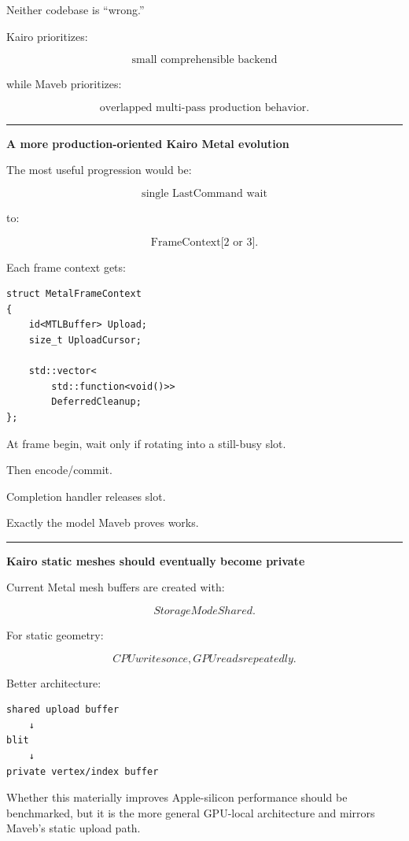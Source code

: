 Neither codebase is ``wrong.''

Kairo prioritizes:

\[
\boxed{
\text{small comprehensible backend}
}
\]

while Maveb prioritizes:

\[
\boxed{
\text{overlapped multi-pass production behavior}.
}
\]

\begin{center}\rule{0.5\linewidth}{0.5pt}\end{center}

\textbf{A more production-oriented Kairo Metal evolution}

The most useful progression would be:

\[
\text{single LastCommand wait}
\]

to:

\[
\text{FrameContext[2 or 3]}.
\]

Each frame context gets:

\begin{verbatim}
struct MetalFrameContext
{
    id<MTLBuffer> Upload;
    size_t UploadCursor;

    std::vector<
        std::function<void()>>
        DeferredCleanup;
};
\end{verbatim}

At frame begin, wait only if rotating into a still-busy slot.

Then encode/commit.

Completion handler releases slot.

Exactly the model Maveb proves works.

\begin{center}\rule{0.5\linewidth}{0.5pt}\end{center}

\textbf{Kairo static meshes should eventually become private}

Current Metal mesh buffers are created with:

\[
StorageModeShared.
\]

For static geometry:

\[
CPU writes once,
GPU reads repeatedly.
\]

Better architecture:

\begin{verbatim}
shared upload buffer
    ↓
blit
    ↓
private vertex/index buffer
\end{verbatim}

Whether this materially improves Apple-silicon performance should be benchmarked, but it is the more general GPU-local architecture and mirrors Maveb's static upload path.

